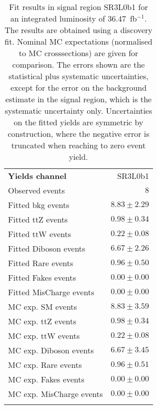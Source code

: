 

\begin{table}
\begin{center}
\setlength{\tabcolsep}{0.0pc}
{\small
\begin{tabular*}{\textwidth}{@{\extracolsep{\fill}}lr}
\noalign{\smallskip}\hline\noalign{\smallskip}
{\bfseries Yields channel}           & SR3L0b1              \\[-0.05cm]
\noalign{\smallskip}\hline\noalign{\smallskip}
Observed events          & $8$                    \\
\noalign{\smallskip}\hline\noalign{\smallskip}
Fitted bkg events         & $8.83 \pm 2.29$              \\
\noalign{\smallskip}\hline\noalign{\smallskip}
        Fitted ttZ events         & $0.98 \pm 0.34$              \\
        Fitted ttW events         & $0.22 \pm 0.08$              \\
        Fitted Diboson events         & $6.67 \pm 2.26$              \\
        Fitted Rare events         & $0.96 \pm 0.50$              \\
        Fitted Fakes events         & $0.00 \pm 0.00$              \\
        Fitted MisCharge events         & $0.00 \pm 0.00$              \\
 \noalign{\smallskip}\hline\noalign{\smallskip}
MC exp. SM events              & $8.83 \pm 3.59$              \\
\noalign{\smallskip}\hline\noalign{\smallskip}
        MC exp. ttZ events         & $0.98 \pm 0.34$              \\
        MC exp. ttW events         & $0.22 \pm 0.08$              \\
        MC exp. Diboson events         & $6.67 \pm 3.45$              \\
        MC exp. Rare events         & $0.96 \pm 0.51$              \\
        MC exp. Fakes events         & $0.00 \pm 0.00$              \\
        MC exp. MisCharge events         & $0.00 \pm 0.00$              \\
\noalign{\smallskip}\hline\noalign{\smallskip}
\end{tabular*}
}
\end{center}
\caption{Fit results in signal region SR3L0b1 for an integrated luminosity of 36.47~fb$^{-1}$.
The results are obtained using a discovery fit. Nominal MC expectations (normalised to MC crosssections) are given for comparison. 
The errors shown are the statistical plus systematic uncertainties, except for the error on the background estimate in the signal region, which is the systematic uncertainty only.
Uncertainties on the fitted yields are symmetric by construction, where the negative error is truncated when reaching to zero event yield.
}
\label{table.results.systematics.in.logL.fit..Yields.SR3L0b1}
\end{table}
\clearpage
%